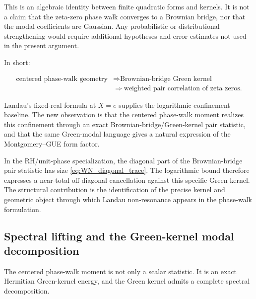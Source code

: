 \documentclass[11pt]{amsart}
\numberwithin{equation}{section}
\theoremstyle{plain}
\theoremstyle{definition}
\theoremstyle{remark}
\begin{document}
This is an algebraic identity between finite quadratic forms and kernels.
It is not a claim that the zeta-zero phase walk converges to a Brownian
bridge, nor that the modal coefficients are Gaussian. Any probabilistic
or distributional strengthening would require additional hypotheses and
error estimates not used in the present argument.

In short:

\begin{equation}
\begin{aligned}
\text{centered phase-walk geometry}
&\Longrightarrow
\text{Brownian-bridge Green kernel}
\\
&\Longrightarrow
\text{weighted pair correlation of zeta zeros}.
\end{aligned}
\label{eq:phase_walk_green_kernel_pair_correlation}
\end{equation}

Landau's fixed-real formula at \(X=e\) supplies the logarithmic
confinement baseline. The new observation is that the centered
phase-walk moment realizes this
confinement through an exact Brownian-bridge/Green-kernel pair statistic,
and that the same Green-modal language gives a natural expression of the
Montgomery--GUE form factor.

In the RH/unit-phase specialization, the diagonal part of the
Brownian-bridge pair statistic has size \eqref{eq:WN_diagonal_trace}.
The logarithmic bound therefore expresses a near-total off-diagonal
cancellation against this specific Green kernel. The structural
contribution is the identification of the precise kernel and geometric
object through which Landau non-resonance appears in the phase-walk
formulation.

\subsection{Spectral lifting and the Green-kernel modal decomposition}
\label{subsec:spectral_lifting_green_kernel_modal_decomposition}

The centered phase-walk moment is not only a scalar statistic. It is an
exact Hermitian Green-kernel energy, and the Green kernel admits a
complete spectral decomposition.
\end{document}

